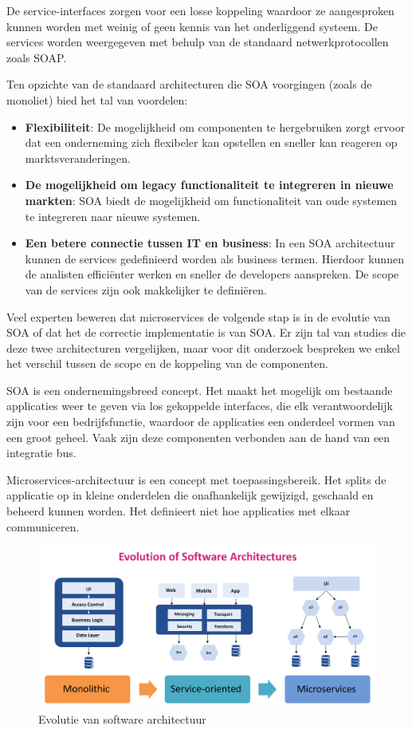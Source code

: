 De service-interfaces zorgen voor een losse koppeling waardoor ze aangesproken kunnen worden met weinig of geen kennis van het onderliggend systeem. De services worden weergegeven met behulp van de standaard netwerkprotocollen zoals SOAP.

Ten opzichte van de standaard architecturen die SOA voorgingen (zoals de monoliet) bied het tal van voordelen:
\begin{itemize}
     \item \textbf{Flexibiliteit}: De mogelijkheid om componenten te hergebruiken zorgt ervoor dat een onderneming zich flexibeler kan opstellen en sneller kan reageren op marktsveranderingen. 
     \item \textbf{De mogelijkheid om legacy functionaliteit te integreren in nieuwe markten}: SOA biedt de mogelijkheid om functionaliteit van oude systemen te integreren naar nieuwe systemen.
     \item \textbf{Een betere connectie tussen IT en business}: In een SOA architectuur kunnen de services gedefinieerd worden als business termen. Hierdoor kunnen de analisten efficiënter werken en sneller de developers aanspreken. De scope van de services zijn ook makkelijker te definiëren.
\end{itemize} 

Veel experten beweren dat microservices de volgende stap is in de evolutie van SOA of dat het de correctie implementatie is van SOA. Er zijn tal van studies die deze twee architecturen vergelijken, maar voor dit onderzoek bespreken we enkel het verschil tussen de scope en de koppeling van de componenten. \autocite{Education2019}


SOA is een ondernemingsbreed concept. Het maakt het mogelijk om bestaande applicaties weer te geven via los gekoppelde interfaces, die elk verantwoordelijk zijn voor een bedrijfsfunctie, waardoor de applicaties een onderdeel vormen van een groot geheel. Vaak zijn deze componenten verbonden aan de hand van een integratie bus.

Microservices-architectuur is een concept met toepassingsbereik. Het splits de applicatie op in kleine onderdelen die onafhankelijk gewijzigd, geschaald en beheerd kunnen worden. Het definieert niet hoe applicaties met elkaar communiceren.
\begin{figure}[!htb]
    \includegraphics[width=1\textwidth]{Evolution-of-Software-architectur.png}
    \caption{Evolutie van software architectuur \label{evolution}}
\end{figure}


